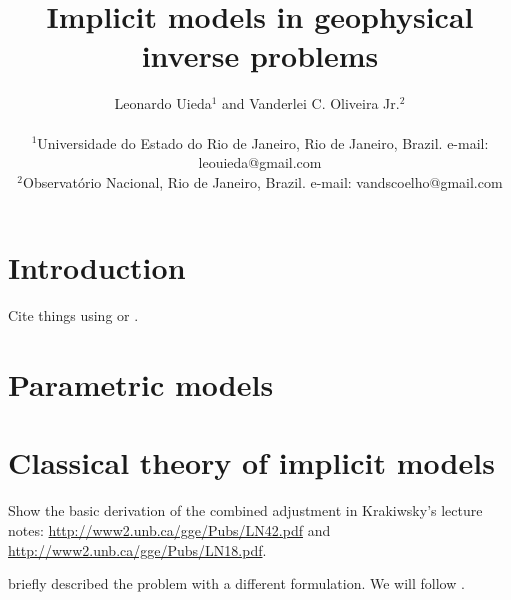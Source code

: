 \documentclass[onecolumn]{article}
\begin{document}
\title{Implicit models in geophysical inverse problems}
\author{
    Leonardo Uieda$^{1}$
    and
    Vanderlei C. Oliveira Jr.$^{2}$
    \\\\
    {\small $^1$Universidade do Estado do Rio de Janeiro, Rio de Janeiro, Brazil.
        e-mail: leouieda@gmail.com}
    \\
    {\small $^2$Observatório Nacional, Rio de Janeiro, Brazil.
        e-mail: vandscoelho@gmail.com}
}


\maketitle


\begin{abstract}
    \lipsum[1]
\end{abstract}


\section{Introduction}

Cite things using \citet{tikhonov1977} or \citep{tikhonov1977}.



\section{Parametric models}

\section{Classical theory of implicit models}

Show the basic derivation of the combined adjustment in Krakiwsky's lecture
notes:
\url{http://www2.unb.ca/gge/Pubs/LN42.pdf} and
\url{http://www2.unb.ca/gge/Pubs/LN18.pdf}.

\citet{menke2012} briefly described the problem with a different formulation.
We will follow \citet{vanicek1986}.
\end{document}
